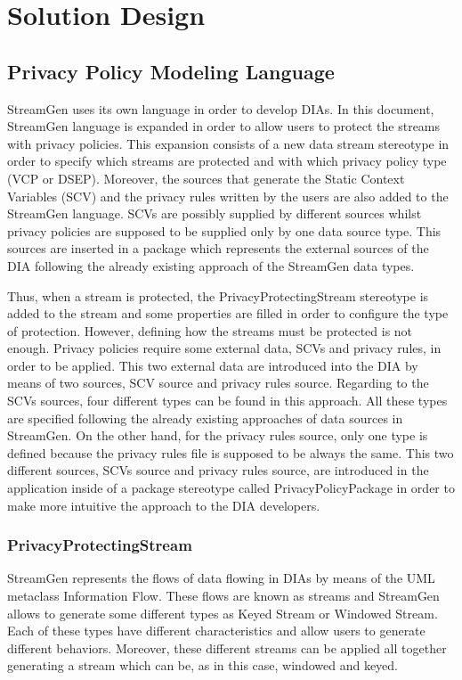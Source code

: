 \chapter[Chapter 4]{Solution Design}
\label{sec:chapter4}

\section{Privacy Policy Modeling Language}

StreamGen uses its own language in order to develop DIAs. In this document, StreamGen language is expanded in order to allow users to protect the streams with privacy policies. This expansion consists of a new data stream stereotype in order to specify which streams are protected and with which privacy policy type (VCP or DSEP). Moreover, the sources that generate the Static Context Variables (SCV) and the privacy rules written by the users are also added to the StreamGen language. SCVs are possibly supplied by different sources whilst privacy policies are supposed to be supplied only by one data source type. This sources are inserted in a package which represents the external sources of the DIA following the already existing approach of the StreamGen data types.

Thus, when a stream is protected, the PrivacyProtectingStream stereotype is added to the stream and some properties are filled in order to configure the type of protection. However, defining how the streams must be protected is not enough. Privacy policies require some external data, SCVs and privacy rules, in order to be applied. This two external data are introduced into the DIA by means of two sources, SCV source and privacy rules source. Regarding to the SCVs sources, four different types can be found in this approach. All these types are specified following the already existing approaches of data sources in StreamGen. On the other hand, for the privacy rules source, only one type is defined because the privacy rules file is supposed to be always the same. This two different sources, SCVs source and privacy rules source, are introduced in the application inside of a package stereotype called PrivacyPolicyPackage in order to make more intuitive the approach to the DIA developers.

\subsection{PrivacyProtectingStream}

StreamGen represents the flows of data flowing in DIAs by means of the UML metaclass Information Flow. These flows are known as streams and StreamGen allows to generate some different types as Keyed Stream or Windowed Stream. Each of these types have different characteristics and allow users to generate different behaviors. Moreover, these different streams can be applied all together generating a stream which can be, as in this case, windowed and keyed.

